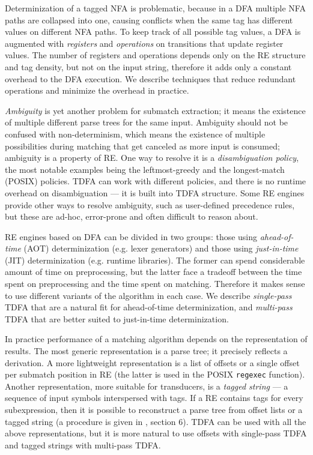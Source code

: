 \documentclass[]{article}
\begin{document}
Determinization of a tagged NFA is problematic, because in a DFA multiple NFA paths are collapsed into one,
causing conflicts when the same tag has different values on different NFA paths.
To keep track of all possible tag values, a DFA is augmented with \emph{registers}
and \emph{operations} on transitions that update register values.
The number of registers and operations depends only on the RE structure and tag density,
but not on the input string,
therefore it adds only a constant overhead to the DFA execution.
We describe techniques that reduce redundant operations and minimize the overhead in practice.
\medskip

\emph{Ambiguity} is yet another problem for submatch extraction;
it means the existence of multiple different parse trees for the same input.
Ambiguity should not be confused with non-determinism,
which means the existence of multiple possibilities during matching that get canceled as more input is consumed;
ambiguity is a property of RE.
%
One way to resolve it is a \emph{disambiguation policy},
the most notable examples being the leftmost-greedy and the longest-match (POSIX) policies.
TDFA can work with different policies, and there is no runtime overhead on disambiguation --- it is built into TDFA structure.
Some RE engines provide other ways to resolve ambiguity, such as user-defined precedence rules,
but these are ad-hoc, error-prone and often difficult to reason about.
\medskip

RE engines based on DFA can be divided in two groups:
those using \emph{ahead-of-time} (AOT) determinization (e.g. lexer generators)
and those using \emph{just-in-time} (JIT) determinization (e.g. runtime libraries).
The former can spend considerable amount of time on preprocessing,
but the latter face a tradeoff between the time spent on preprocessing and the time spent on matching.
Therefore it makes sense to use different variants of the algorithm in each case.
We describe \emph{single-pass} TDFA that are a natural fit for ahead-of-time determinization,
and \emph{multi-pass} TDFA that are better suited to just-in-time determinization.
\medskip

In practice performance of a matching algorithm depends on the representation of results.
The most generic representation is a parse tree; it precisely reflects a derivation.
A more lightweight representation is a list of offsets or a single offset per submatch position in RE
(the latter is used in the POSIX \texttt{regexec} function).
Another representation, more suitable for transducers, is a \emph{tagged string} ---
a sequence of input symbols interspersed with tags.
If a RE contains tags for every subexpression,
then it is possible to reconstruct a parse tree from offset lists or a tagged string (a procedure is given in \cite{BorTro19}, section 6).
TDFA can be used with all the above representations,
but it is more natural to use offsets with single-pass TDFA
and tagged strings with multi-pass TDFA.
\medskip
\end{document}
